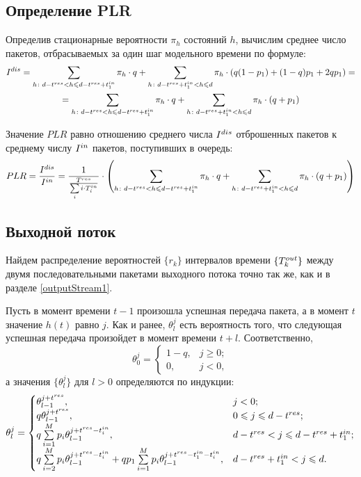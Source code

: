 \subsection{Определение PLR}
Определив стационарные вероятности $\pi_h$ состояний $h$, вычислим среднее число пакетов, отбрасываемых за один шаг модельного времени по формуле:
\begin{gather}
	\notag
	I^{dis} = \sum\limits_{h\colon d - t^{res} < h \leqslant d - t^{res} + t^{in}_1} \pi_h\cdot q +
	\sum\limits_{h\colon d - t^{res} + t^{in}_1 < h \leqslant d} \pi_h\cdot 
	\left(q(1-p_1)+(1-q)p_1+2qp_1\right) =\\
	= \sum\limits_{h\colon d - t^{res} < h \leqslant d - t^{res} + t^{in}_1} \pi_h\cdot q +
	\sum\limits_{h\colon d - t^{res} + t^{in}_1 < h \leqslant d} \pi_h\cdot 
	\left(q+p_1\right)
\end{gather}

Значение $PLR$ равно отношению среднего числа $I^{dis}$ отброшенных пакетов к среднему числу $I^{in}$ пакетов, поступивших в очередь:
$$
	PLR = \frac{I^{dis}}{I^{in}} = \frac{1}{\frac{T^{res}}{\sum\limits_{i} i\cdot T^{in}_i}} \cdot \left( \sum\limits_{h\colon d - t^{res} < h \leqslant d - t^{res} + t^{in}_1} \pi_h\cdot q +
	\sum\limits_{h\colon d - t^{res} + t^{in}_1 < h \leqslant d} \pi_h\cdot 
	\left(q+p_1\right) \right)
$$
\subsection{Выходной поток}
Найдем распределение вероятностей $\{r_k\}$ интервалов времени $\{T^{out}_k\}$ между двумя последовательными пакетами выходного потока точно так же, как и в разделе \ref{outputStream1}.
 
Пусть в момент времени $t-1$ произошла успешная передача пакета, а в момент $t$ значение $h(t)$ равно $j$. Как и ранее, $\theta_l^j$ есть вероятность того, что следующая успешная передача произойдет в момент времени $t + l$. Соответственно,
\begin{equation}
	\label{theta3}
	\theta_0^j = \begin{cases}
	1-q, &j \geqslant 0; \\
	0, &j < 0,
	\end{cases}
\end{equation}
а значения $\{\theta_l^j\}$ для $l>0$ определяются по индукции:
\begin{equation}
	\theta_{l}^j = \begin{cases}
		\theta_{l-1}^{j+t^{res}}, &j < 0;	\\
		q\theta_{l-1}^{j+t^{res}}, &0 \leqslant j \leqslant d - t^{res}; \\
		q \sum\limits_{i = 1}^M p_i\theta_{l-1}^{j+t^{res}-t^{in}_i}, 
			& d - t^{res} < j \leqslant d - t^{res} + t^{in}_1; \\
		q \sum\limits_{i=2}^M p_i  \theta_{l-1}^{j+t^{res}-t^{in}_i} + 
			q p_1 \sum\limits_{i=1}^M p_i  \theta_{l-1}^{j+t^{res}-t^{in}_1-t^{in}_i},
			&d - t^{res} + t^{in}_1 < j \leqslant d.
	\end{cases}
	\label{theta4}
\end{equation} 


